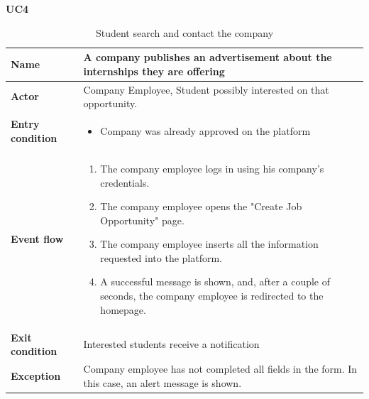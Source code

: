     \textbf{UC4}
    \nopagebreak
    \begin{table}[H]
    \centering
    \begin{tabular}{|l|p{11.9cm}|}
        \hline
        \textbf{Name}            & A company publishes an advertisement about the internships they are
offering \\\hline
        \textbf{Actor}           & Company Employee, Student possibly interested on that opportunity.        \\\hline
        \textbf{Entry condition} &
        \begin{itemize}
              \item Company was already approved on the platform
        \end{itemize}                                        \\\hline
        \textbf{Event flow}      &
        \begin{enumerate}[label=\arabic*.]
              \item The company employee logs in using his company's credentials.
              \item The company employee opens the "Create Job Opportunity" page.
              \item The company employee inserts all the information requested into the platform.
              \item A successful message is shown, and, after a couple of seconds, the company employee is redirected to the homepage.
        \end{enumerate}            \\\hline
        \textbf{Exit condition}  & Interested students receive a notification \\\hline
        \textbf{Exception}       &  Company employee has not completed all fields in the form. In this case, an alert message is shown.   \\\hline
    \end{tabular}
    \caption{Student search and contact the company}
    \label{table:Student search and contact the company}
    \end{table}

